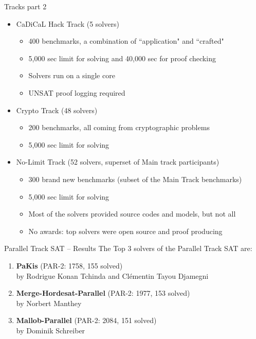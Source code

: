 \documentclass[trans]{beamer}
\begin{document}
\begin{frame}{Tracks part 2}
\begin{itemize}
\item CaDiCaL Hack Track (5 solvers)
\begin{itemize}
\item 400 benchmarks, a combination of ``application" and ``crafted"
\item 5,000 sec limit for solving and 40,000 sec for proof checking
\item Solvers run on a single core
\item UNSAT proof logging required
\end{itemize}
\pause
\medskip
\item Crypto Track (48 solvers)
\begin{itemize}
\item 200 benchmarks, all coming from cryptographic problems
\item 5,000 sec limit for solving
\end{itemize}
\pause
\medskip
\item No-Limit Track (52 solvers, superset of Main track participants)
\begin{itemize}
\item 300 brand new benchmarks (subset of the Main Track benchmarks)
\item 5,000 sec limit for solving
\item Most of the solvers provided source codes and models, but not all
\item No awards: top solvers were open source and proof producing
\end{itemize}
\end{itemize}
\end{frame}


\begin{frame}{Parallel Track SAT -- Results}
The Top 3 solvers of the Parallel Track SAT are:
\begin{enumerate}
\item[1]<4-> {\bf PaKis} (PAR-2: 1758, 155 solved)\\
by Rodrigue Konan Tchinda and Clémentin Tayou Djamegni
\item[2]<3-> {\bf Merge-Hordesat-Parallel} (PAR-2: 1977, 153 solved)\\
by Norbert Manthey
\item[3]<2-> {\bf Mallob-Parallel} (PAR-2: 2084, 151 solved)\\
by Dominik Schreiber
\end{enumerate}
\end{frame}
\end{document}
